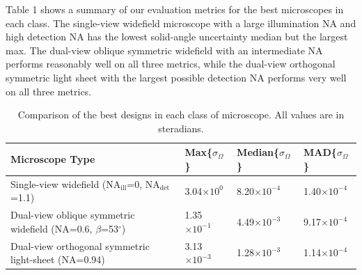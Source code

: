 \documentclass[10pt]{article}
\begin{document}
Table 1 shows a summary of our evaluation metrics for the best microscopes in
each class. The single-view widefield microscope with a large illumination NA
and high detection NA has the lowest solid-angle uncertainty median but the
largest max. The dual-view oblique symmetric widefield with an intermediate NA
performs reasonably well on all three metrics, while the dual-view orthogonal
symmetric light sheet with the largest possible detection NA performs very well
on all three metrics.

\begin{table}[ht!]
\centering
\caption{Comparison of the best designs in each class of microscope. All values
  are in steradians.}
\begin{tabular}{llll}
  \toprule
Microscope Type&Max\{$\sigma_{\Omega}$\}&Median\{$\sigma_{\Omega}$\}&MAD\{$\sigma_{\Omega}$\}\\ \midrule
Single-view widefield (NA${}_\textrm{ill}$=0, NA${}_\textrm{det}$=1.1)&3.04$\times 10^{0}$&8.20$\times 10^{-4}$&1.40$\times 10^{-4}$ \\ 
Dual-view oblique symmetric widefield (NA=0.6, $\beta$=53${}^{\circ}$)&1.35$\times 10^{-1}$&4.49$\times 10^{-3}$&9.17$\times 10^{-4}$\\
Dual-view orthogonal symmetric light-sheet (NA=0.94)&3.13$\times 10^{-3}$&1.28$\times 10^{-3}$&1.14$\times 10^{-4}$\\
\bottomrule
\end{tabular}
\end{table}
\end{document}
